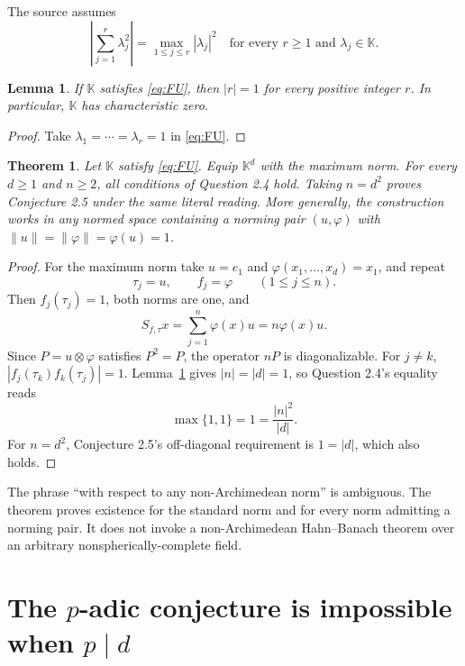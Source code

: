 \documentclass[11pt]{article}
\newtheorem{theorem}{Theorem}
\newtheorem{lemma}{Lemma}
\newcommand{\K}{\mathbb K}
\begin{document}
The source assumes
\begin{equation}\label{eq:FU}
 \left|\sum_{j=1}^r\lambda_j^2\right|
 =\max_{1\leq j\leq r}|\lambda_j|^2
 \quad\text{for every }r\geq1\text{ and }\lambda_j\in\K.
\end{equation}

\begin{lemma}\label{lem:integers}
If \(\K\) satisfies \eqref{eq:FU}, then \(|r|=1\) for every positive
integer \(r\).  In particular, \(\K\) has characteristic zero.
\end{lemma}

\begin{proof}
Take \(\lambda_1=\cdots=\lambda_r=1\) in \eqref{eq:FU}.
\end{proof}

\begin{theorem}\label{thm:nonarch}
Let \(\K\) satisfy \eqref{eq:FU}.  Equip \(\K^d\) with the maximum norm.
For every \(d\geq1\) and \(n\geq2\), all conditions of Question 2.4 hold.
Taking \(n=d^2\) proves Conjecture 2.5 under the same literal reading.
More generally, the construction works in any normed space containing a
norming pair \((u,\varphi)\) with
\(\|u\|=\|\varphi\|=\varphi(u)=1\).
\end{theorem}

\begin{proof}
For the maximum norm take \(u=e_1\) and
\(\varphi(x_1,\ldots,x_d)=x_1\), and repeat
\[
 \tau_j=u,\qquad f_j=\varphi\qquad(1\leq j\leq n).
\]
Then \(f_j(\tau_j)=1\), both norms are one, and
\[
 S_{f,\tau}x=\sum_{j=1}^n\varphi(x)u=n\varphi(x)u.
\]
Since \(P=u\otimes\varphi\) satisfies \(P^2=P\), the operator \(nP\) is
diagonalizable.  For \(j\ne k\),
\(|f_j(\tau_k)f_k(\tau_j)|=1\).  Lemma~\ref{lem:integers} gives
\(|n|=|d|=1\), so Question 2.4's equality reads
\[
 \max\{1,1\}=1=\frac{|n|^2}{|d|}.
\]
For \(n=d^2\), Conjecture 2.5's off-diagonal requirement is
\(1=|d|\), which also holds.
\end{proof}

The phrase ``with respect to any non-Archimedean norm'' is ambiguous.  The
theorem proves existence for the standard norm and for every norm admitting a
norming pair.  It does not invoke a non-Archimedean Hahn--Banach theorem over
an arbitrary nonspherically-complete field.

\section*{The \(p\)-adic conjecture is impossible when \(p\mid d\)}
\end{document}
